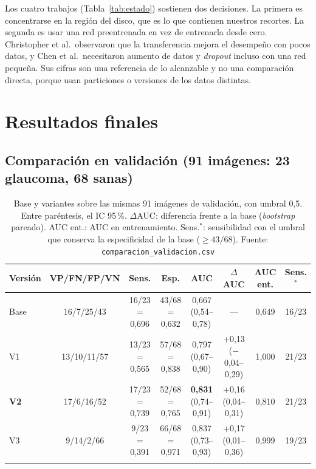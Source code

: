\documentclass[pdflatex,sn-mathphys-num]{sn-jnl}%
\theoremstyle{thmstyleone}%
\theoremstyle{thmstyletwo}%
\theoremstyle{thmstylethree}%
\begin{document}
Los cuatro trabajos (Tabla~\ref{tab:estado}) sostienen dos decisiones. La primera es concentrarse en la región del disco, que es lo que contienen nuestros recortes. La segunda es usar una red preentrenada en vez de entrenarla desde cero. Christopher et al.\ observaron que la transferencia mejora el desempeño con pocos datos, y Chen et al.\ necesitaron aumento de datos y \textit{dropout} incluso con una red pequeña. Sus cifras son una referencia de lo alcanzable y no una comparación directa, porque usan particiones o versiones de los datos distintas.

\FloatBarrier
\section{Resultados finales}\label{sec:resultados}

\subsection{Comparación en validación (91 imágenes: 23 glaucoma, 68 sanas)}

\begin{table}[htbp]
\setlength{\tabcolsep}{3pt}%
\caption{Base y variantes sobre las mismas 91 imágenes de validación, con umbral 0,5. Entre paréntesis, el IC 95\,\%. $\Delta$AUC: diferencia frente a la base (\textit{bootstrap} pareado). AUC ent.: AUC en entrenamiento. Sens.$^{*}$: sensibilidad con el umbral que conserva la especificidad de la base ($\ge 43/68$). Fuente: \texttt{comparacion\_validacion.csv}}\label{tab:comparacion}
\begin{tabular}{@{}lccccccc@{}}
\toprule
Versión & VP/FN/FP/VN & Sens. & Esp. & AUC & $\Delta$AUC & AUC ent. & Sens.$^{*}$ \\
\midrule
Base & 16/7/25/43 & 16/23 = 0,696 & 43/68 = 0,632 & 0,667 (0,54--0,78) & --- & 0,649 & 16/23 \\
V1 & 13/10/11/57 & 13/23 = 0,565 & 57/68 = 0,838 & 0,797 (0,67--0,90) & +0,13 ($-$0,04--0,29) & 1,000 & 21/23 \\
\textbf{V2} & 17/6/16/52 & 17/23 = 0,739 & 52/68 = 0,765 & \textbf{0,831} (0,74--0,91) & +0,16 (0,04--0,31) & 0,810 & 21/23 \\
V3 & 9/14/2/66 & 9/23 = 0,391 & 66/68 = 0,971 & 0,837 (0,73--0,93) & +0,17 (0,01--0,36) & 0,999 & 19/23 \\
\botrule
\end{tabular}
\end{table}
\end{document}
